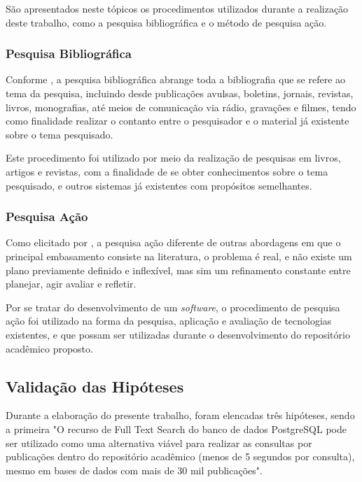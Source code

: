 São apresentados neste tópicos os procedimentos utilizados
durante a realização deste trabalho, como a pesquisa bibliográfica e
o método de pesquisa ação.

\subsubsection{Pesquisa Bibliográfica}

Conforme \citep[p. 183]{LAKATOS2003:metodologia}, a pesquisa bibliográfica
abrange toda a bibliografia que se refere ao tema da pesquisa,
incluindo desde publicações avulsas, boletins, jornais, revistas,
livros, monografias, até meios de comunicação via rádio,
gravações e filmes, tendo como finalidade realizar o contanto
entre o pesquisador e o material já existente sobre o tema pesquisado.

Este procedimento foi utilizado por meio da realização de pesquisas
em livros, artigos e revistas, com a finalidade de se obter
conhecimentos sobre o tema pesquisado, e outros sistemas
já existentes com propósitos semelhantes.

\subsubsection{Pesquisa Ação}

Como elicitado por \citep[p. 45]{LOVATO:metodologia}, a pesquisa ação
diferente de outras abordagens em que o principal
embasamento consiste na literatura, o problema é real, e não existe
um plano previamente definido e inflexível, mas sim um refinamento
constante entre planejar, agir avaliar e refletir.

Por se tratar do desenvolvimento de um \emph{software}, o procedimento
de pesquisa ação foi utilizado na forma da pesquisa,
aplicação e avaliação de tecnologias existentes, e que possam
ser utilizadas durante o desenvolvimento do repositório
acadêmico proposto.

\subsection{Validação das Hipóteses}

Durante a elaboração do presente trabalho, foram elencadas
três hipóteses, sendo a  primeira "O recurso de Full Text
Search do banco de dados PostgreSQL pode ser utilizado como
uma alternativa viável para realizar as consultas por publicações
dentro do repositório acadêmico (menos de 5 segundos por consulta),
mesmo em bases de dados com mais de 30 mil publicações".


